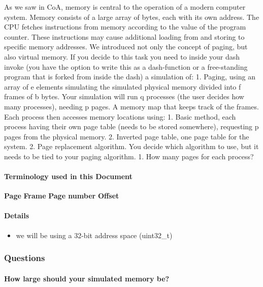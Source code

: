 As we saw in CoA, memory is central to the operation of a modern
computer system. Memory consists of a large array of bytes, each with
its own address. The CPU fetches instructions from memory according to
the value of the program counter. These instructions may cause
additional loading from and storing to specific memory addresses. We
introduced not only the concept of paging, but also virtual memory. If
you decide to this task you need to inside your dash invoke (you have
the option to write this as a dash-function or a free-standing program
that is forked from inside the dash) a simulation of: 1. Paging, using
an array of e elements simulating the simulated physical memory divided
into f frames of b bytes. Your simulation will run q processes (the user
decides how many processes), needing p pages. A memory map that keeps
track of the frames. Each process then accesses memory locations using:
1. Basic method, each process having their own page table (needs to be
stored somewhere), requesting p pages from the physical memory. 2.
Inverted page table, one page table for the system. 2. Page replacement
algorithm. You decide which algorithm to use, but it needs to be tied to
your paging algorithm. 1. How many pages for each process?

\hypertarget{terminology-used-in-this-document}{%
\paragraph{Terminology used in this
Document}\label{terminology-used-in-this-document}}

\textbf{Page} \textbf{Frame} \textbf{Page number} \textbf{Offset}

\hypertarget{details}{%
\paragraph{Details}\label{details}}

\begin{itemize}
\tightlist
\item
  we will be using a 32-bit address space (uint32\_t)
\end{itemize}

\hypertarget{questions}{%
\subsubsection{Questions}\label{questions}}

\hypertarget{how-large-should-your-simulated-memory-be}{%
\paragraph{How large should your simulated memory
be?}\label{how-large-should-your-simulated-memory-be}}

